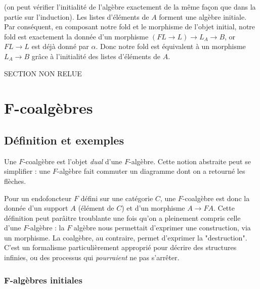 \documentclass{article}
\begin{document}
(on peut vérifier l'initialité de l'algèbre exactement de la même façon que dans la partie sur l'induction). Les listes d'éléments de $A$ forment une algèbre initiale. Par conséquent, en composant notre fold et le morphisme de l'objet initial, notre fold est exactement la donnée  d'un morphisme $(FL \rightarrow L) \rightarrow L_A \rightarrow B $, or $FL \rightarrow L$ est déjà donné par $\alpha$. Donc notre fold est équivalent à un morphisme $L_A \rightarrow B$ grâce à l'initialité des listes d'éléments de $A$.



SECTION NON RELUE

\section{F-coalgèbres}

\subsection{Définition et exemples}

Une $F$-coalgèbre est l'objet \textit{dual} d'une $F$-algèbre. Cette notion abstraite peut se simplifier : une $F$-algèbre fait commuter un diagramme dont on a retourné les flèches.

\begin{center}
\end{center}

Pour un endofoncteur $F$ défini sur une catégorie $C$, une $F$-coalgèbre est donc la donnée d'un support $A$ (élément de $C$) et d'un morphisme $A \rightarrow FA$. Cette définition peut parâitre troublante une fois qu'on a pleinement compris celle d'une $F$-algèbre : la $F$ algèbre nous permettait d'exprimer une construction, via un morphisme. La coalgèbre, au contraire, permet d'exprimer la "destruction". C'est un formalisme particulièrement approprié  pour décrire des structures infinies, ou des processus qui \textit{pourraient} ne pas s'arrêter.

\subsubsection{F-algèbres initiales}
\end{document}

